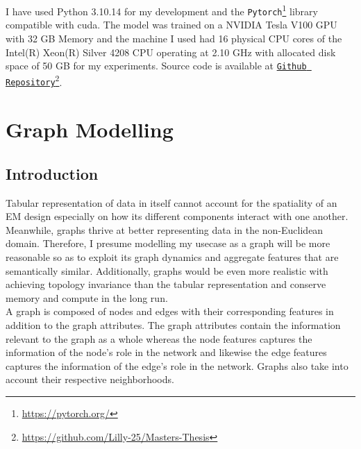 \documentclass{report} %
\begin{document}
I have used Python 3.10.14 for my development and the \texttt{Pytorch}\footnote{\url{https://pytorch.org/}} library compatible with cuda.
The model was trained on a NVIDIA Tesla V100 \ac{GPU} with 32 GB Memory and the machine I used had 16 physical CPU cores of the Intel(R) Xeon(R) Silver 
4208 CPU operating at 2.10 GHz with allocated disk space of 50 GB for my experiments.
Source code is available at \texttt{\href{https://github.com/Lilly-25/Masters-Thesis}{Github Repository}}\footnote{\url{https://github.com/Lilly-25/Masters-Thesis}}.

\chapter{Graph Modelling} 

\section{Introduction}\label{sec:Introduction}

Tabular representation of data in itself cannot account for the spatiality of an \ac{EM} design especially on how its different components interact with one another. 
Meanwhile, graphs thrive at better representing data in the non-Euclidean domain.
Therefore, I presume modelling my usecase as a graph will be more reasonable so as to exploit its graph dynamics and aggregate features that are semantically similar.
Additionally, graphs would be even more realistic with achieving topology invariance than the tabular representation and conserve memory and compute in the long run.\\

A graph is composed of nodes and edges with their corresponding features in addition to the graph attributes.
The graph attributes contain the information relevant to the graph as a whole whereas the node features captures the information of the node's role in the network and 
likewise the edge features captures the information of the edge's role in the network. Graphs also take into account their respective neighborhoods.\\
\end{document}
